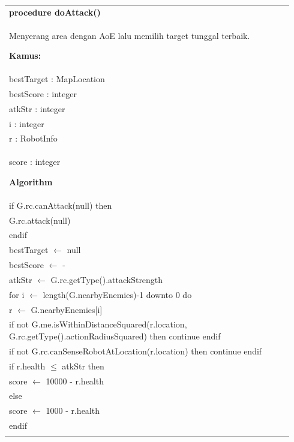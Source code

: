 \documentclass{article}
\newenvironment{pseudobox}
{
\centering
\begin{longtable}{|p{0.94\linewidth}|}
\hline
}
{
\\ \hline
\end{longtable}
\vspace{0.05cm}
}
\begin{document}
\begin{pseudobox}
\textbf{procedure doAttack()} \\
{ Menyerang area dengan AoE lalu memilih target tunggal terbaik. }

\textbf{Kamus:} \\
\hspace*{1em} bestTarget : MapLocation \\
\hspace*{1em} bestScore : integer \\
\hspace*{1em} atkStr : integer \\
\hspace*{1em} i : integer \\
\hspace*{1em} r : RobotInfo \\
\hspace*{1em} score : integer

\textbf{Algorithm} \\
\hspace*{1em} if G.rc.canAttack(null) then \\
\hspace*{2em} G.rc.attack(null) \\
\hspace*{1em} endif \\

\hspace*{1em} bestTarget $\leftarrow$ null \\
\hspace*{1em} bestScore $\leftarrow$ -\infty \\
\hspace*{1em} atkStr $\leftarrow$ G.rc.getType().attackStrength \\

\hspace*{1em} for i $\leftarrow$ length(G.nearbyEnemies)-1 downto 0 do \\
\hspace*{2em} r $\leftarrow$ G.nearbyEnemies[i] \\
\hspace*{2em} if not G.me.isWithinDistanceSquared(r.location, G.rc.getType().actionRadiusSquared) then continue endif \\
\hspace*{2em} if not G.rc.canSenseRobotAtLocation(r.location) then continue endif \\

\hspace*{2em} if r.health $\leq$ atkStr then \\
\hspace*{3em} score $\leftarrow$ 10000 - r.health \\
\hspace*{2em} else \\
\hspace*{3em} score $\leftarrow$ 1000 - r.health \\
\hspace*{2em} endif \\


\end{pseudobox}
\end{document}
